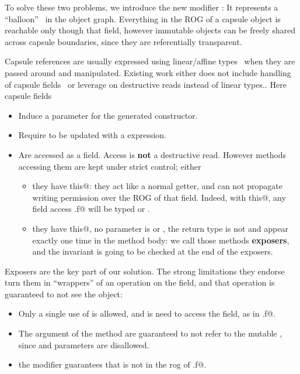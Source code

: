 To solve these two problems, we introduce the new modifier \Q@capsule@:
It represents a ``balloon''~\cite{Almeida97,ServettoEtAl13a} in the object graph.
Everything in the ROG of a capsule object is reachable only though that field, however
immutable objects can be freely shared across capsule boundaries, since they are referentially transparent.

Capsule references are usually expressed using linear/affine types~\cite{Boyland01} when they are passed around and manipulated.
Existing work 
either does not include handling of capsule fields~\cite{ServettoEtAl13a,ServettoZucca15}
or leverage on destructive reads instead of linear types.\cite{GordonEtAl12,clebsch2015deny}.
Here capsule fields 
\begin{itemize}
\item Induce a \Q@capsule@ parameter for the generated constructor.
\item Require to be updated with a \Q@capsule@ expression.
\item Are accessed as a \Q@mut@ field.
Access is \textbf{not} a destructive read.
 However methods accessing them are kept under
strict control; either
\begin{itemize}
\item they have \Q@read this@: they act like a normal getter, and can not propagate
writing permission over the ROG of that field.
Indeed, with \Q@read this@, any field access \Q@this.f@ will be typed \Q@read@ or \Q@imm@.
\item they have \Q@mut this@, no parameter is \Q@mut@ or \Q@read@,
the return type is not \Q@mut@ and \Q@this@ appear exactly one time in
the method body: we call those methods \textbf{exposers}, and the invariant is going to be checked at the end of
the exposers.
\end{itemize}
\end{itemize}
Exposers are the key part of our solution.
The strong limitations they endorse turn them in ``wrappers'' of an operation 
on the field, and that operation is guaranteed to not see the \Q@this@ object:
\begin{itemize}
\item Only a single use of \Q@this@ is allowed, and is need to access the field, as in \Q@this.f@.
\item The argument of the method are guaranteed to not refer to the mutable \Q@this@, since \Q@mut@ and \Q@read@
parameters are disallowed.
\item the \Q@capsule@ modifier guarantees that 
\Q@this@ is not in the rog of \Q@this.f@.
\end{itemize}
